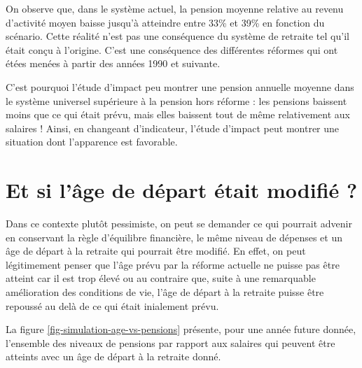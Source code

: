 \documentclass[10pt]{article}
\begin{document}
On observe que, dans le système actuel, la pension moyenne relative au revenu d'activité 
moyen baisse jusqu'à atteindre entre 33\% et 39\% en fonction du scénario. 
Cette réalité n'est pas une conséquence du système de retraite tel qu'il était conçu 
à l'origine. 
C'est une conséquence des différentes réformes qui ont étées menées 
à partir des années 1990 et suivante. 

C'est pourquoi l'étude d'impact peu montrer une pension annuelle moyenne 
dans le système universel supérieure à la pension hors réforme : 
les pensions baissent moins que ce qui était prévu, mais elles baissent 
tout de même relativement aux salaires ! 
Ainsi, en changeant d'indicateur, l'étude d'impact peut montrer une situation 
dont l'apparence est favorable. 


\section{Et si l'âge de départ était modifié ?}

Dans ce contexte plutôt pessimiste, on peut se demander ce qui pourrait 
advenir en conservant la règle d'équilibre financière, le même niveau de dépenses 
et un âge de départ à la retraite qui pourrait être modifié. 
En effet, on peut légitimement penser que l'âge prévu par la réforme actuelle 
ne puisse pas être atteint car il est trop élevé ou au contraire que, suite à une 
remarquable amélioration des conditions de vie, l'âge de départ à la retraite 
puisse être repoussé au delà de ce qui était inialement prévu. 

La figure \ref{fig-simulation-age-vs-pensions} présente, pour une année future donnée, l'ensemble des niveaux 
de pensions par rapport aux salaires qui peuvent être atteints avec 
un âge de départ à la retraite donné. 
\end{document}
